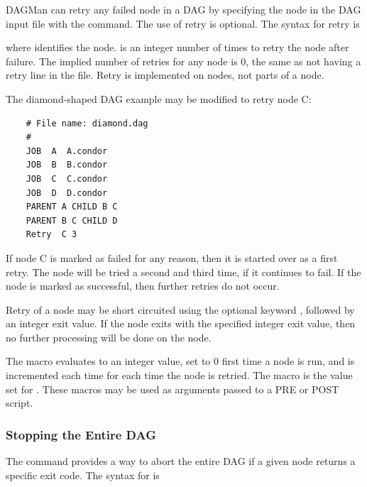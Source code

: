 DAGMan can retry any failed node in a DAG by
specifying the node in the DAG input file 
with the  command.
The use of retry is optional.
The syntax for retry is

   

where  identifies the node.
 is an integer
number of times to retry the node after failure.
The implied number of retries for any node is 0,
the same as not having a retry line in the file. 
Retry is implemented on nodes, not parts of a node.

The diamond-shaped DAG example may be modified to
retry node C:

\footnotesize
\begin{verbatim}
    # File name: diamond.dag
    #
    JOB  A  A.condor 
    JOB  B  B.condor 
    JOB  C  C.condor	
    JOB  D  D.condor
    PARENT A CHILD B C
    PARENT B C CHILD D
    Retry  C 3
\end{verbatim}
\normalsize

If node C is marked as failed for any reason,
then it is started over as a first retry.
The node will be tried a second and third time,
if it continues to fail.
If the node is marked as successful, then further retries do not occur.

Retry of a node may be short circuited using the
optional keyword , followed by an integer exit value.
If the node exits with the specified integer exit value,
then no further processing will be done
on the node. 

The macro  evaluates to an 
integer value, set to 0 first time a node is run,
and is incremented each time for each time the node is retried. 
The macro  is the value set for
.
These macros may be used as arguments passed to a PRE or POST script.

\subsubsection{\label{dagman:abort}Stopping the Entire DAG}

The  command provides a way
to abort the entire DAG if a given node returns a specific exit
code.  The syntax for  is

  

